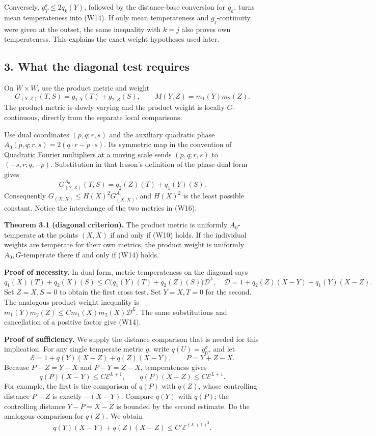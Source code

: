 \documentclass[
  11pt,
]{article}
\begin{document}
Conversely, \(g_Y^\sigma\leq2q_k(Y)\), followed by the distance-base
conversion for \(g_k\), turns mean temperateness into (W14). If only
mean temperateness and \(g_j\)-continuity were given at the outset, the
same inequality with \(k=j\) also proves own temperateness. This
explains the exact weight hypotheses used later.

\subsection{3. What the diagonal test
requires}\label{what-the-diagonal-test-requires}

On \(W\times W\), use the product metric and weight \[
G_{(Y,Z)}(T,S)=g_{1,Y}(T)+g_{2,Z}(S),\qquad
M(Y,Z)=m_1(Y)m_2(Z).
\tag{W15}
\] The product metric is slowly varying and the product weight is
locally \(G\)-continuous, directly from the separate local comparisons.

Use dual coordinates \((p,q;r,s)\) and the auxiliary quadratic phase
\(A_0(p,q;r,s)=2(q\cdot r-p\cdot s)\). Its symmetric map in the
convention of \href{gauss-transform-estimates.pdf}{Quadratic Fourier
multipliers at a moving scale} sends \((p,q;r,s)\) to \((-s,r;q,-p)\).
Substitution in that lesson's definition of the phase-dual form gives \[
G_{(Y,Z)}^{A_0}(T,S)=q_2(Z)(T)+q_1(Y)(S).
\tag{W16}
\] Consequently \(G_{(X,X)}\leq H(X)^2G_{(X,X)}^{A_0}\), and \(H(X)^2\)
is the least possible constant. Notice the interchange of the two
metrics in (W16).

\textbf{Theorem 3.1 (diagonal criterion).} The product metric is
uniformly \(A_0\)-temperate at the points \((X,X)\) if and only if (W10)
holds. If the individual weights are temperate for their own metrics,
the product weight is uniformly \(A_0,G\)-temperate there if and only if
(W14) holds.

\textbf{Proof of necessity.} In dual form, metric temperateness on the
diagonal says \[
q_1(X)(T)+q_2(X)(S)
\leq C\big(q_1(Y)(T)+q_2(Z)(S)\big)\mathcal D^L,
\quad
\mathcal D=1+q_2(Z)(X-Y)+q_1(Y)(X-Z).
\tag{W17}
\] Set \(Z=X,S=0\) to obtain the first cross test. Set \(Y=X,T=0\) for
the second. The analogous product-weight inequality is
\(m_1(Y)m_2(Z)\leq Cm_1(X)m_2(X)\mathcal D^L\). The same substitutions
and cancellation of a positive factor give (W14).

\textbf{Proof of sufficiency.} We supply the distance comparison that is
needed for this implication. For any single temperate metric \(g\),
write \(q(U)=g_U^\sigma\), and let \[
\mathcal E=1+q(Y)(X-Z)+q(Z)(X-Y),\qquad P=Y+Z-X.
\] Because \(P-Z=Y-X\) and \(P-Y=Z-X\), temperateness gives \[
q(P)(X-Y)\leq C\mathcal E^{L+1},\qquad
q(P)(X-Z)\leq C\mathcal E^{L+1}.
\] For example, the first is the comparison of \(q(P)\) with \(q(Z)\),
whose controlling distance \(P-Z\) is exactly \(-(X-Y)\). Compare
\(q(Y)\) with \(q(P)\); the controlling distance \(Y-P=X-Z\) is bounded
by the second estimate. Do the analogous comparison for \(q(Z)\). We
obtain \[
q(Y)(X-Y)+q(Z)(X-Z)\leq C'\mathcal E^{(L+1)^2}.
\tag{W18}
\]
\end{document}
